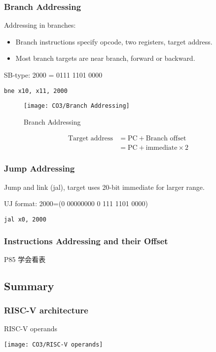 \subsubsection{Branch Addressing}
Addressing in branches: 
\begin{itemize}
    \item Branch instructions specify opcode, two registers, target address. 
    \item Most branch targets are near branch, forward or backward. 
\end{itemize}
SB-type: 2000 = 0111 1101 0000
\begin{lstlisting}[language={[x86masm]Assembler}]
bne x10, x11, 2000
\end{lstlisting}
\begin{figure}[!htb]
    \centering
    \texttt{[image: CO3/Branch Addressing]}
    \caption{Branch Addressing}
\end{figure}

\begin{align*}
    \text{Target address} &= \text{PC} + \text{Branch offset}\\
    &= \text{PC} + \text{immediate} \times 2
\end{align*}
\subsubsection{Jump  Addressing}
Jump and link (jal), target uses 20-bit immediate for larger range. 

UJ format: 2000=(0 00000000 0 111 1101 0000)
\begin{lstlisting}[language={[x86masm]Assembler}]
jal x0, 2000
\end{lstlisting}


\subsubsection{Instructions Addressing and their Offset}
P85 学会看表

\subsection{Summary}
\subsubsection{RISC-V architecture}

\begin{table*}[hptb]
    \centering
    \caption{RISC-V operands}
    \label{RISC-V operands}
    \texttt{[image: CO3/RISC-V operands]}
\end{table*}

